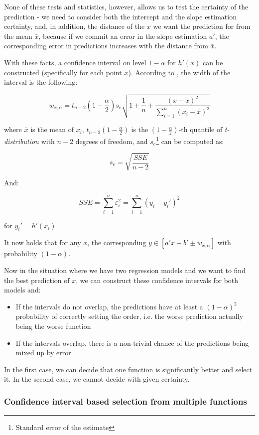 None of these tests and statistics, however, allows us to test the certainty of the prediction - we need to consider both the intercept and the slope estimation certainty, and, in addition, the distance of the $x$ we want the prediction for from the mean $\bar{x}$, because if we commit an error in the slope estimation $a'$, the corresponding error in predictions increases with the distance from $\bar{x}$. 

With these facts, a confidence interval on level $1 - \alpha$ for $h'(x)$ can be constructed (specifically for each point $x$). According to \cite{weiss_introductory_2010}, the width of the interval is the following:

\[
w_{x, \alpha} = t_{n - 2}(1-\frac{\alpha}{2}) s_e\sqrt{1 + \frac{1}{n} + \frac{(x - \bar{x})^2}{ \sum_{i = 1}^{n} (x_i - \bar{x})^2 }}
\]

where \(\bar{x}\) is the mean of \(x_i\), $t_{n - 2}(1-\frac{\alpha}{2})$ is the $(1-\frac{\alpha}{2})$-th quantile of \textit{t-distribution} with $n-2$ degrees of freedom, and $s_e$\footnote{Standard error of the estimate} can be computed as:

\[s_e = \sqrt{\frac{SSE}{n-2}}\]

And:

\[SSE = \sum_{i = 1}^{n} \varepsilon_i^2  =  \sum_{i = 1}^{n} (y_i - y_i')^2 \]

for \(y_i' = h'(x_i)\).

It now holds that for any $x$, the corresponding $y \in [a'x + b' \pm w_{x, \alpha}]$ with probability $(1-\alpha)$.

Now in the situation where we have two regression models and we want to find the best prediction of $x$, we can construct these confidence intervals for both models and:

\begin{itemize}
	\item If the intervals do not overlap, the predictions have at least a $(1 - \alpha)^2$ probability of correctly setting the order, i.e. the worse prediction actually being the worse function
	\item If the intervals overlap, there is a non-trivial chance of the predictions being mixed up by error
\end{itemize}

In the first case, we can decide that one function is significantly better and select it. In the second case, we cannot decide with given certainty.

\subsubsection{Confidence interval based selection from multiple functions}

